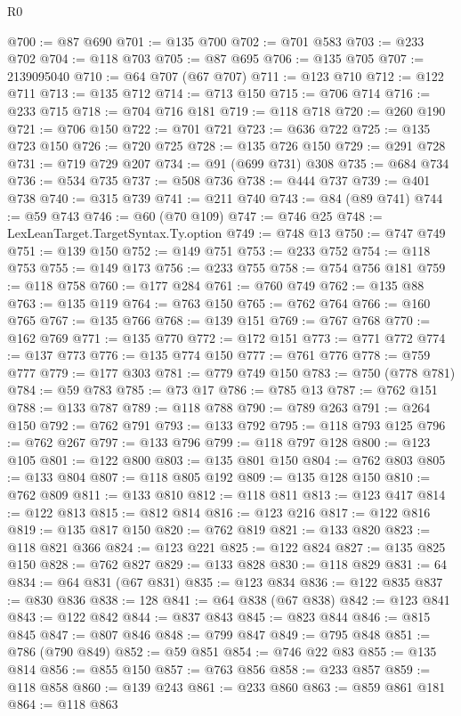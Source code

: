 \begin{lexlean}{R0}
\begin{coremodule}
@700 := @87 @690
@701 := @135 @700
@702 := @701 @583
@703 := @233 @702
@704 := @118 @703
@705 := @87 @695
@706 := @135 @705
@707 := 2139095040
@710 := @64 @707 (@67 @707)
@711 := @123 @710
@712 := @122 @711
@713 := @135 @712
@714 := @713 @150
@715 := @706 @714
@716 := @233 @715
@718 := @704 @716 @181
@719 := @118 @718
@720 := @260 @190
@721 := @706 @150
@722 := @701 @721
@723 := @636 @722
@725 := @135 @723 @150
@726 := @720 @725
@728 := @135 @726 @150
@729 := @291 @728
@731 := @719 @729 @207
@734 := @91 (@699 @731) @308
@735 := @684 @734
@736 := @534 @735
@737 := @508 @736
@738 := @444 @737
@739 := @401 @738
@740 := @315 @739
@741 := @211 @740
@743 := @84 (@89 @741)
@744 := @59 @743
@746 := @60 (@70 @109)
@747 := @746 @25
@748 := LexLeanTarget.TargetSyntax.Ty.option
@749 := @748 @13
@750 := @747 @749
@751 := @139 @150
@752 := @149 @751
@753 := @233 @752
@754 := @118 @753
@755 := @149 @173
@756 := @233 @755
@758 := @754 @756 @181
@759 := @118 @758
@760 := @177 @284
@761 := @760 @749
@762 := @135 @88
@763 := @135 @119
@764 := @763 @150
@765 := @762 @764
@766 := @160 @765
@767 := @135 @766
@768 := @139 @151
@769 := @767 @768
@770 := @162 @769
@771 := @135 @770
@772 := @172 @151
@773 := @771 @772
@774 := @137 @773
@776 := @135 @774 @150
@777 := @761 @776
@778 := @759 @777
@779 := @177 @303
@781 := @779 @749 @150
@783 := @750 (@778 @781)
@784 := @59 @783
@785 := @73 @17
@786 := @785 @13
@787 := @762 @151
@788 := @133 @787
@789 := @118 @788
@790 := @789 @263
@791 := @264 @150
@792 := @762 @791
@793 := @133 @792
@795 := @118 @793 @125
@796 := @762 @267
@797 := @133 @796
@799 := @118 @797 @128
@800 := @123 @105
@801 := @122 @800
@803 := @135 @801 @150
@804 := @762 @803
@805 := @133 @804
@807 := @118 @805 @192
@809 := @135 @128 @150
@810 := @762 @809
@811 := @133 @810
@812 := @118 @811
@813 := @123 @417
@814 := @122 @813
@815 := @812 @814
@816 := @123 @216
@817 := @122 @816
@819 := @135 @817 @150
@820 := @762 @819
@821 := @133 @820
@823 := @118 @821 @366
@824 := @123 @221
@825 := @122 @824
@827 := @135 @825 @150
@828 := @762 @827
@829 := @133 @828
@830 := @118 @829
@831 := 64
@834 := @64 @831 (@67 @831)
@835 := @123 @834
@836 := @122 @835
@837 := @830 @836
@838 := 128
@841 := @64 @838 (@67 @838)
@842 := @123 @841
@843 := @122 @842
@844 := @837 @843
@845 := @823 @844
@846 := @815 @845
@847 := @807 @846
@848 := @799 @847
@849 := @795 @848
@851 := @786 (@790 @849)
@852 := @59 @851
@854 := @746 @22 @83
@855 := @135 @814
@856 := @855 @150
@857 := @763 @856
@858 := @233 @857
@859 := @118 @858
@860 := @139 @243
@861 := @233 @860
@863 := @859 @861 @181
@864 := @118 @863

\end{coremodule}
\end{lexlean}

